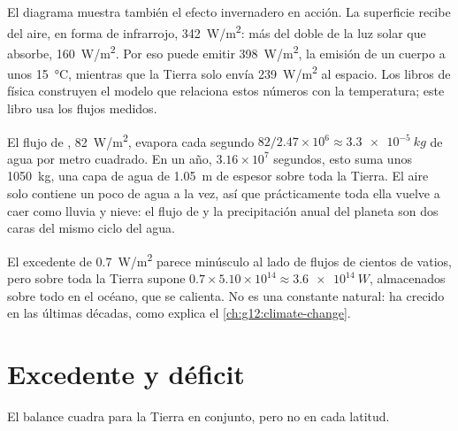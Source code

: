 El diagrama muestra también el efecto invernadero en acción. La superficie
recibe del aire, en forma de infrarrojo, \qty{342}{W/m^2}: más del doble de
la luz solar que absorbe, \qty{160}{W/m^2}. Por eso puede emitir
\qty{398}{W/m^2}, la emisión de un cuerpo a unos \qty{15}{\degreeCelsius},
mientras que la Tierra solo envía \qty{239}{W/m^2} al espacio. Los libros de
física construyen el modelo que relaciona estos números con la temperatura;
este libro usa los flujos medidos.

\begin{example}\label{ex:g10:earth-energy-budget:evaporation}
El flujo de , \qty{82}{W/m^2}, evapora cada segundo
$82/2.47\times
10^6 \approx \qty{3.3e-5}{kg}$ de agua por metro cuadrado. En
un año, $3.16\times10^7$ segundos, esto suma unos \qty{1050}{kg}, una capa de
agua de \qty{1.05}{m} de espesor sobre toda la Tierra. El aire solo contiene
un poco de agua a la vez, así que prácticamente toda ella vuelve a caer como
lluvia y nieve: el flujo de  y la precipitación anual del
planeta son dos caras del mismo ciclo del agua.
\end{example}

\begin{remark}[El desequilibrio]\label{rem:g10:earth-energy-budget:imbalance}
El excedente de \qty{0.7}{W/m^2} parece minúsculo al lado de flujos de
cientos de vatios, pero sobre toda la Tierra supone
$0.7 \times 5.10\times10^{14} \approx
\qty{3.6e14}{W}$, almacenados sobre
todo en el océano, que se calienta. No es una constante natural: ha crecido
en las últimas décadas, como explica el \cref{ch:g12:climate-change}.
\end{remark}

\section{Excedente y déficit}

El balance cuadra para la Tierra en conjunto, pero no en cada latitud.

